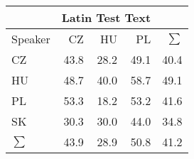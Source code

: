 \begin{tabular}{l|rrr|r}
\hline
& \multicolumn{3}{c}{Latin Test Text} & \\
\hline
 Speaker   &   CZ &   HU &   PL &   $\sum$ \\
\hline
CZ        & 43.8 & 28.2 & 49.1 &     40.4 \\
HU        & 48.7 & 40.0 & 58.7 &     49.1 \\
PL        & 53.3 & 18.2 & 53.2 &     41.6 \\
SK        & 30.3 & 30.0 & 44.0 &     34.8 \\
\hline
 $\sum$   & 43.9 & 28.9 & 50.8 &     41.2 \\
\hline
\end{tabular}
